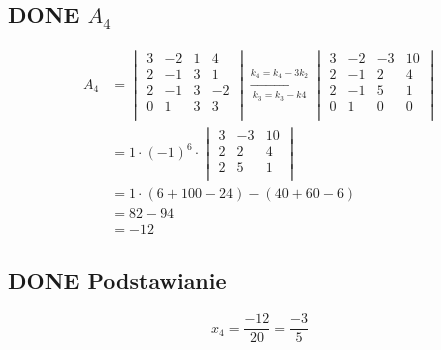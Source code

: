 \documentclass[11pt]{article}
\begin{document}
\subsection{{\bfseries\sffamily DONE} \(A_4\)}
\label{sec:org1f33b48}
\begin{align*}A_4 &= \begin{vmatrix}
                       3  & -2 & 1 & 4 \\
                       2  & -1 & 3 & 1 \\
                       2 & -1 & 3 & -2 \\
                       0 & 1 & 3 & 3 \\
                     \end{vmatrix}
  \xrightarrow[k_3 = k_3 - k4]{k_4 = k_4 - 3k_2}
  \begin{vmatrix}
    3 & -2 & -3  & 10 \\
    2 & -1 &  2  & 4 \\
    2 & -1 & 5   & 1 \\
    0 & 1  & 0   & 0 \\
  \end{vmatrix}\\
                  &= 1 \cdot (-1)^{6} \cdot \begin{vmatrix}
                                              3 & -3 & 10 \\
                                              2 & 2  & 4  \\
                                              2 & 5  & 1\\
                                              \end{vmatrix}\\
                  &=1 \cdot (6 + 100 - 24) - (40 + 60 -6)\\
                  &=82 - 94\\
                  &= - 12
\end{align*}
\subsection{{\bfseries\sffamily DONE} Podstawianie}
\label{sec:org5f4088b}
$$x_4 = \frac{-12}{20} = \frac{-3}{5}$$
\end{document}
